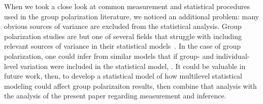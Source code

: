 \documentclass[11pt,letterpaper]{article}
\begin{document}
\begin{itemize}
    When we took a close look at common measurement and statistical procedures
    used in the group polarization literature, we noticed an additional problem: 
    many obvious sources of variance are excluded from the statistical analysis.
    Group polarization studies are but one of several fields that struggle
    with including relevant sources of variance in their statistical models~\cite{Yarkoni2021}.
    In the case of group polarization, one could infer from similar models
    that if group- and individual-level variation were included in the
    statistical model, . It could be valuable in future work, then, to 
    develop a statistical model of how multilevel statistical modeling could
    affect group polarizaiton results, then combine that analysis with the
    analysis of the present paper regarding measurement and inference.
\end{itemize}




\setlength{\bibleftmargin}{.125in}
\setlength{\bibindent}{-\bibleftmargin}


\end{document}
